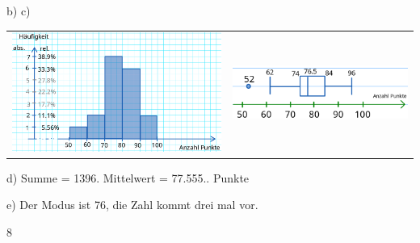 {b) c)

\begin{tabular}{cc}
\includegraphics[width=88mm]{img/daan/HistogrammVoll.png} & \includegraphics[width=74mm]{img/daan/BoxplotVoll.png}
 \end{tabular}

d) Summe = 1396. Mittelwert = 77.555.. Punkte

e) Der Modus ist 76, die Zahl kommt drei mal vor.
}{8}










